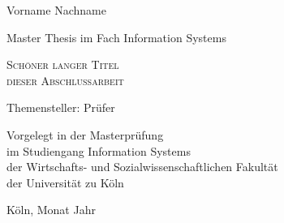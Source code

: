 \begin{titlepage}

\setlength{\wpXoffset}{7cm}

\large Vorname Nachname

\vspace{2.25cm}

\begin{center}
	\large Master Thesis im Fach Information Systems
	
	\vspace{2.5cm}

	\LARGE 
		\textsc{
			Schöner langer Titel \\
			dieser Abschlussarbeit
		}

	\vspace{1.25cm}

	\large Themensteller: Prüfer

	\vspace{5cm}

	Vorgelegt in der Masterprüfung\\
	im Studiengang Information Systems\\
	der Wirtschafts- und Sozialwissenschaftlichen Fakultät\\
	der Universität zu Köln

	\vspace{5cm}

	Köln, Monat Jahr

\end{center}

\end{titlepage}